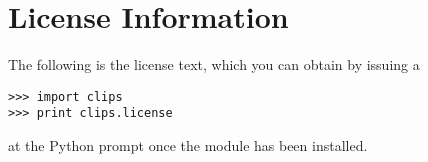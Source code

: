 \chapter{License Information}%
\label{pyclips-license}

The following is the license text, which you can obtain by issuing a

\begin{verbatim}
>>> import clips
>>> print clips.license
\end{verbatim}

at the Python prompt once the \pyclips{} module has been installed.



